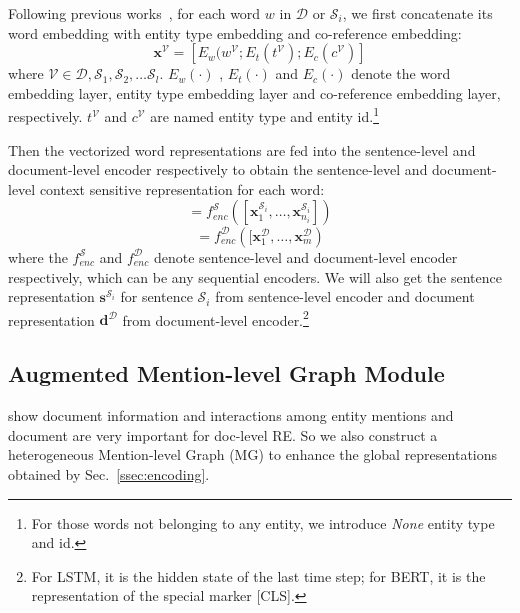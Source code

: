 \documentclass[11pt,a4paper]{article}
\begin{document}
Following previous works~\citep{DocRED-paper, GAIN}, for each word $w$ in $\mathcal{D}$ or $\mathcal{S}_{i}$, we first concatenate its word embedding with entity type embedding and co-reference embedding:
\begin{equation}
\textbf{x}^\mathcal{V} = [E_w(w^\mathcal{V}; E_t(t^\mathcal{V}); E_c(c^\mathcal{V})]
\end{equation}
where $\mathcal{V} \in {\mathcal{D}, \mathcal{S}_{1}, \mathcal{S}_{2}, \ldots \mathcal{S}_{l}}$. $E_w(\cdot)$ , $E_t(\cdot)$ and $E_c(\cdot)$ denote the word embedding layer, entity type embedding layer and co-reference embedding layer, respectively. $t^\mathcal{V}$ and $c^\mathcal{V}$ are named entity type and entity id.\footnote{For those words not belonging to any entity, we introduce \textit{None} entity type and id.}

Then the vectorized word representations are fed into the sentence-level and document-level encoder respectively to obtain the sentence-level and document-level context sensitive representation for each word:
\begin{equation}
[\textbf{g}^{\mathcal{S}_{i}}_{1}, \ldots, \textbf{g}^{\mathcal{S}_{i}}_{n_{i}}] = f_{enc}^{\mathcal{S}}([\textbf{x}^{\mathcal{S}_{i}}_1, \ldots, \textbf{x}^{\mathcal{S}_{i}}_{n_{i}}])
\end{equation}
\begin{equation}
[\textbf{g}^{\mathcal{D}}_{1}, \ldots, \textbf{g}^{\mathcal{D}}_{m}] = f_{enc}^{\mathcal{D}}([\textbf{x}^{\mathcal{D}}_1, \ldots, \textbf{x}^{\mathcal{D}}_{m})
\end{equation}
where the ${f}_{enc}^{\mathcal{S}}$ and ${f}_{enc}^{\mathcal{D}}$ denote sentence-level and document-level encoder respectively, which can be any sequential encoders. We will also get the sentence representation $\textbf{s}^{\mathcal{S}_i}$ for sentence $\mathcal{S}_i$ from sentence-level encoder and document representation $\textbf{d}^{\mathcal{D}}$ from document-level encoder.\footnote{For LSTM, it is the hidden state of the last time step; for BERT, it is the representation of the special marker [CLS].}

\subsection{Augmented Mention-level Graph Module\label{ssec:MG}}
\citet{GAIN} show document information and interactions among entity mentions and document are very important for doc-level RE. So we also construct a heterogeneous Mention-level Graph (MG) to enhance the global representations obtained by Sec.~\ref{ssec:encoding}.
\end{document}
